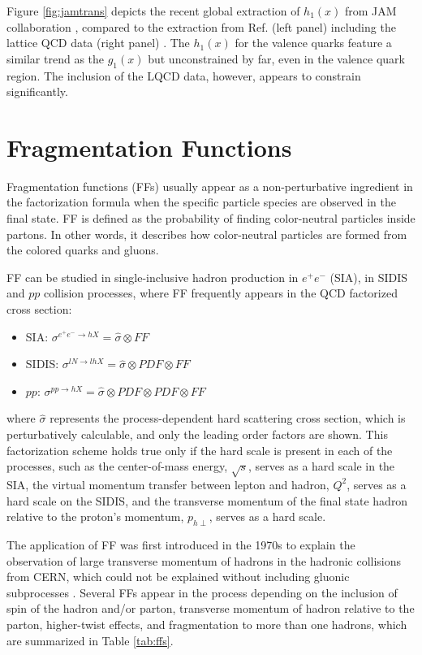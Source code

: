 Figure \ref{fig:jamtrans} depicts the recent global extraction of $h_1(x)$ from JAM collaboration \cite{Cocuzza:2023oam}, compared to the extraction from Ref. \cite{Radici:2018iag} (left panel) including the lattice QCD data (right panel) \cite{Gupta:2018, Hasan:2019}. The $h_1(x)$ for the valence quarks feature a similar trend as the $g_1(x)$ but unconstrained by far, even in the valence quark region. The inclusion of the LQCD data, however, appears to constrain significantly.    

\section{Fragmentation Functions}
Fragmentation functions (FFs)  usually appear as a non-perturbative ingredient in the factorization formula when the specific particle species are observed in the final state. FF is defined as the probability of finding  color-neutral particles inside partons. In other words, it describes how color-neutral particles are formed from the colored quarks and gluons.

FF can be studied in single-inclusive hadron production in $e^+e^-$ (SIA), in SIDIS and $pp$ collision processes, where FF frequently appears in the QCD factorized cross section: 
\begin{itemize}
    \item SIA: $\sigma^{e^+e^- \rightarrow hX} = \hat{\sigma}\otimes FF$
    \item SIDIS: $\sigma^{lN \rightarrow lhX} = \hat{\sigma}\otimes PDF \otimes FF$
    \item $pp$: $\sigma^{pp \rightarrow hX} = \hat{\sigma}\otimes PDF \otimes PDF \otimes FF$
\end{itemize}
where $\hat{\sigma}$ represents the process-dependent hard scattering cross section, which is perturbatively calculable, and only the leading order factors are shown. This factorization scheme holds true only if the hard scale is present in each of the processes, such as the center-of-mass energy, $\sqrt{s}$, serves as a hard scale in the SIA, the virtual momentum transfer between lepton and hadron, $Q^2$, serves as a hard scale on the SIDIS, and the transverse momentum of the final state hadron relative to the proton's momentum, $p_{h\perp}$, serves as a hard scale. 

The application of FF was first introduced in the 1970s to explain the observation of large transverse momentum of hadrons in the hadronic collisions from CERN, which could not be explained without including gluonic subprocesses \cite{Metz:2016}. Several FFs appear in the process depending on the inclusion of spin of the hadron and/or parton, transverse momentum of hadron relative to the parton, higher-twist effects, and fragmentation to more than one hadrons, which are summarized in Table \ref{tab:ffs}. 

